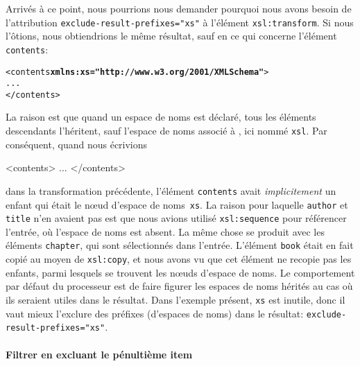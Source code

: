 Arrivés à ce point, nous pourrions nous demander pourquoi nous avons
besoin de l'attribution
\texttt{exclude-result-prefixes="xs"} à l'élément
\texttt{xsl:transform}. Si nous l'ôtions, nous obtiendrions le même
résultat, sauf en ce qui concerne l'élément \texttt{contents}:
\begin{alltt}
\small   <contents \textbf{xmlns:xs="http://www.w3.org/2001/XMLSchema"}>
     ...
   </contents>
\end{alltt}
La raison est que quand un espace de noms est déclaré, tous les
éléments descendants l'héritent, sauf l'espace de noms associé à
\XSLT, ici nommé \texttt{xsl}. Par conséquent, quand nous écrivions
\begin{sverb}
   <contents>
     ...
   </contents>
\end{sverb}
dans la transformation précédente, l'élément \texttt{contents} avait
\emph{implicitement} un enfant qui était le n{\oe}ud d'espace de
noms~\texttt{xs}. La raison pour laquelle \texttt{author} et
\texttt{title} n'en avaient pas est que nous avions utilisé
\texttt{xsl:sequence} pour référencer l'entrée, où l'espace de noms
est absent. La même chose se produit avec les éléments
\texttt{chapter}, qui sont sélectionnés dans l'entrée. L'élément
\texttt{book} était en fait copié au moyen de \texttt{xsl:copy}, et
nous avons vu que cet élément ne recopie pas les enfants, parmi
lesquels se trouvent les n{\oe}uds d'espace de noms. Le comportement
par défaut du processeur \XSLT est de faire figurer les espaces de
noms hérités au cas où ils seraient utiles dans le résultat. Dans
l'exemple présent, \texttt{xs} est inutile, donc il vaut mieux
l'exclure des préfixes (d'espaces de noms) dans le résultat:
\texttt{exclude-result-prefixes="xs"}.

\paragraph{Filtrer en excluant le pénultième item}

